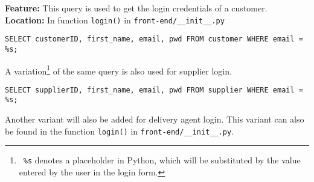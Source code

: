 \textbf{Feature:} This query is used to get the login credentials of a customer. \\
\textbf{Location:} In function \texttt{login()} in \texttt{front-end/\_\_init\_\_.py}

\begin{lstlisting}
SELECT customerID, first_name, email, pwd FROM customer WHERE email = %s;
\end{lstlisting}

A variation\footnote{
    \ \texttt{\%s} denotes a placeholder in Python, which will be substituted by the value entered by the user in the login form.
} of the same query is also used for supplier login.

\begin{lstlisting}
SELECT supplierID, first_name, email, pwd FROM supplier WHERE email = %s;
\end{lstlisting}

Another variant will also be added for delivery agent login.
This variant can also be found in the function \texttt{login()} in \texttt{front-end/\_\_init\_\_.py}. \\